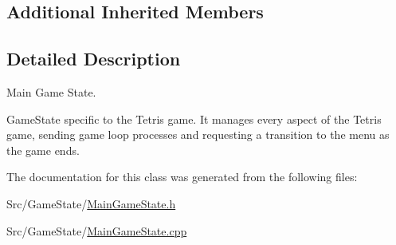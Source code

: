 \subsection*{Additional Inherited Members}


\subsection{Detailed Description}
Main Game State. 

Game\-State specific to the Tetris game. It manages every aspect of the Tetris game, sending game loop processes and requesting a transition to the menu as the game ends. 

The documentation for this class was generated from the following files\-:\begin{DoxyCompactItemize}
\item 
Src/\-Game\-State/\hyperlink{MainGameState_8h}{Main\-Game\-State.\-h}\item 
Src/\-Game\-State/\hyperlink{MainGameState_8cpp}{Main\-Game\-State.\-cpp}\end{DoxyCompactItemize}
